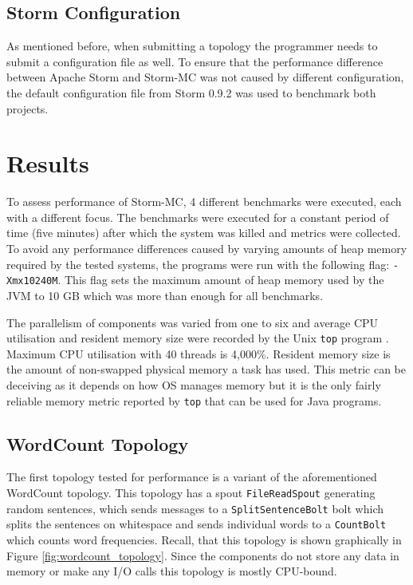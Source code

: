 \subsection{Storm Configuration}

As mentioned before, when submitting a topology the programmer needs to submit a configuration file as well. To ensure that the performance difference between Apache Storm and Storm-MC was not caused by different configuration, the default configuration file from Storm 0.9.2 was used to benchmark both projects.


\section{Results}
\label{sec:performance}

To assess performance of Storm-MC, 4 different benchmarks were executed, each with a different focus. The benchmarks were executed for a constant period of time (five minutes) after which the system was killed and metrics were collected. To avoid any performance differences caused by varying amounts of heap memory required by the tested systems, the programs were run with the following flag: \texttt{-Xmx10240M}. This flag sets the maximum amount of heap memory used by the JVM to 10 GB which was more than enough for all benchmarks.

The parallelism of components was varied from one to six and average CPU utilisation and resident memory size were recorded by the Unix \texttt{top} program \citep{UnixTop}. Maximum CPU utilisation with 40 threads is 4,000\%. Resident memory size is the amount of non-swapped physical memory a task has used. This metric can be deceiving as it depends on how OS manages memory but it is the only fairly reliable memory metric reported by \texttt{top} that can be used for Java programs.

\subsection{WordCount Topology}

The first topology tested for performance is a variant of the aforementioned WordCount topology. This topology has a spout \texttt{FileReadSpout} generating random sentences, which sends messages to a \texttt{SplitSentenceBolt} bolt which splits the sentences on whitespace and sends individual words to a \texttt{CountBolt} which counts word frequencies. Recall, that this topology is shown graphically in Figure \ref{fig:wordcount_topology}. Since the components do not store any data in memory or make any I/O calls this topology is mostly CPU-bound.

